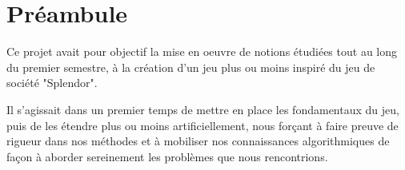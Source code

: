 

\section*{Préambule}




Ce projet avait pour objectif la mise en oeuvre de notions étudiées tout au long du premier 
semestre, à la création d'un jeu plus ou moins inspiré du jeu de société "Splendor". 

Il s'agissait dans un premier temps de mettre en place les fondamentaux du jeu, puis de les 
étendre plus ou moins artificiellement, nous forçant à faire preuve de rigueur dans nos
méthodes et à mobiliser nos connaissances algorithmiques de façon à aborder sereinement les
problèmes que nous rencontrions.



